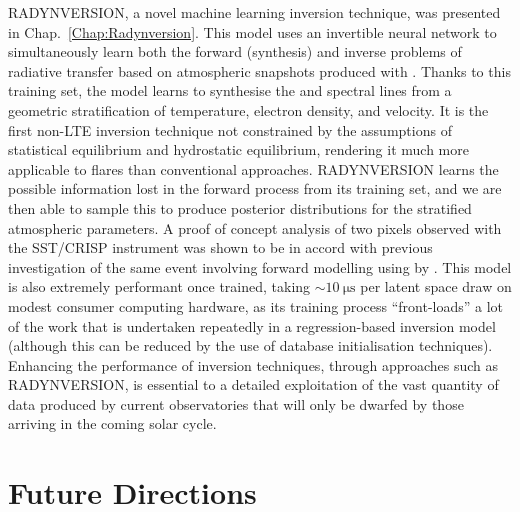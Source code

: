 RADYNVERSION, a novel machine learning inversion technique, was presented in Chap.~\ref{Chap:Radynversion}.
This model uses an invertible neural network to simultaneously learn both the forward (synthesis) and inverse problems of radiative transfer based on atmospheric snapshots produced with \Radyn{}.
Thanks to this training set, the model learns to synthesise the \Ha{} and \CaLine{} spectral lines from a geometric stratification of temperature, electron density, and velocity.
It is the first non-LTE inversion technique not constrained by the assumptions of statistical equilibrium and hydrostatic equilibrium, rendering it much more applicable to flares than conventional approaches.
RADYNVERSION learns the possible information lost in the forward process from its training set, and we are then able to sample this to produce posterior distributions for the stratified atmospheric parameters.
A proof of concept analysis of two pixels observed with the SST/CRISP instrument was shown to be in accord with previous investigation of the same event involving forward modelling using \Radyn{} by \citet{Kuridze2015}.
This model is also extremely performant once trained, taking $\sim\SI{10}{\micro\s}$ per latent space draw on modest consumer computing hardware, as its training process ``front-loads'' a lot of the work that is undertaken repeatedly in a regression-based inversion model (although this can be reduced by the use of database initialisation techniques).
Enhancing the performance of inversion techniques, through approaches such as RADYNVERSION, is essential to a detailed exploitation of the vast quantity of data produced by current observatories that will only be dwarfed by those arriving in the coming solar cycle.

\section*{Future Directions}

